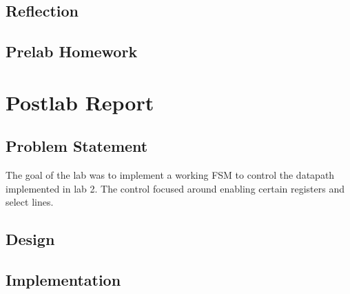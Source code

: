 \documentclass{article}
\begin{document}
\subsection*{Reflection} %

\subsection*{Prelab Homework}

\section*{Postlab Report}

\subsection*{Problem Statement}
The goal of the lab was to implement a working FSM to control the datapath implemented in lab 2. The control focused around enabling certain registers and select lines.

\subsection*{Design}

\subsection*{Implementation}
\end{document}

